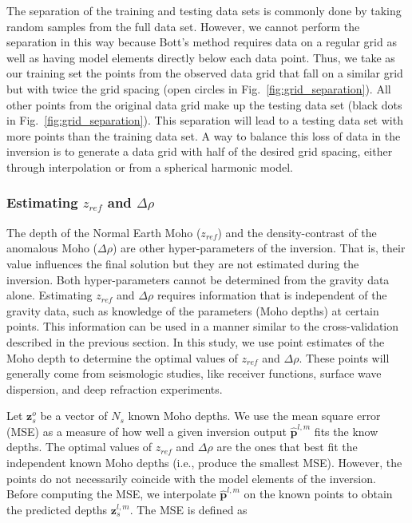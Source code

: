 \documentclass[extra,mreferee]{gji}
\begin{document}
The separation of the training and testing data sets is commonly done by taking
random samples from the full data set.
However, we cannot perform the separation in this way because
Bott's method requires data on a regular grid as well as having model elements
directly below each data point.
Thus, we take as our training set the points from the observed data grid that
fall on a similar grid but with twice the grid spacing
(open circles in Fig.~\ref{fig:grid_separation}).
All other points from the original data grid
make up the testing data set
(black dots in Fig.~\ref{fig:grid_separation}).
This separation will lead to
a testing data set with more points than the training data set.
A way to balance this loss of data in the inversion
is to generate a data grid with half of the desired grid spacing,
either through interpolation
or from a spherical harmonic model.



\subsubsection{Estimating $z_{ref}$ and $\Delta\rho$}

The depth of the Normal Earth Moho ($z_{ref}$)
and the density-contrast of the anomalous Moho ($\Delta\rho$)
are other hyper-parameters of the inversion.
That is, their value influences the final solution
but they are not estimated during the inversion.
Both hyper-parameters cannot be determined from the gravity data alone.
Estimating $z_{ref}$ and $\Delta\rho$ requires
information that is independent of the gravity data,
such as knowledge of the parameters (Moho depths) at certain points.
This information can be used in a manner similar to
the cross-validation described in the previous section.
In this study, we use point estimates of the Moho depth
to determine the optimal values of $z_{ref}$ and $\Delta\rho$.
These points will generally come from seismologic studies,
like receiver functions, surface wave dispersion, and deep refraction
experiments.

Let $\mathbf{z}_s^o$ be a vector of $N_s$ known Moho depths.
We use the mean square error (MSE)
as a measure of how well a given inversion output $\mathbf{\hat{p}}^{l,m}$
fits the know depths.
The optimal values of $z_{ref}$ and $\Delta\rho$
are the ones that best fit the independent known Moho depths
(i.e., produce the smallest MSE).
However, the points do not necessarily coincide
with the model elements of the inversion.
Before computing the MSE,
we interpolate $\mathbf{\hat{p}}^{l,m}$ on the known points
to obtain the predicted depths $\mathbf{z}_s^{l,m}$.
The MSE is defined as
\end{document}
